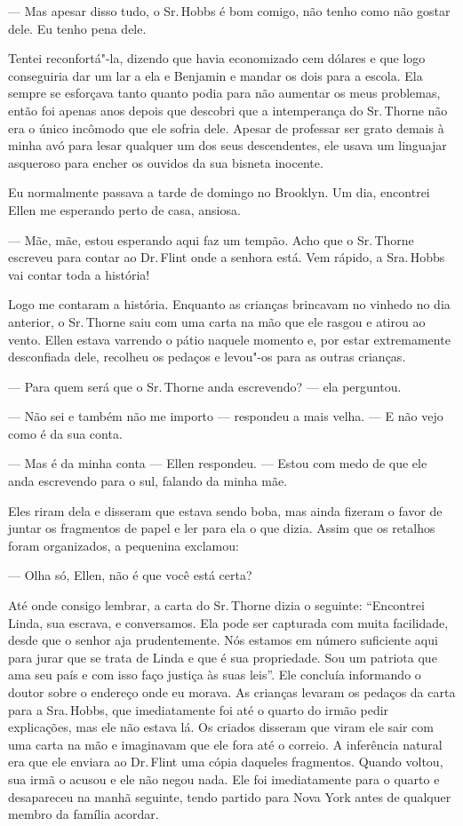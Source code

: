 --- Mas apesar disso tudo, o Sr.\,Hobbs é bom comigo, não tenho como não
gostar dele. Eu tenho pena dele.

Tentei reconfortá"-la, dizendo que havia economizado cem dólares e que
logo conseguiria dar um lar a ela e Benjamin e mandar os dois para a
escola. Ela sempre se esforçava tanto quanto podia para não aumentar os
meus problemas, então foi apenas anos depois que descobri que a
intemperança do Sr.\,Thorne não era o único incômodo que ele sofria dele.
Apesar de professar ser grato demais à minha avó para lesar qualquer um
dos seus descendentes, ele usava um linguajar asqueroso para encher os
ouvidos da sua bisneta inocente.

Eu normalmente passava a tarde de
domingo no Brooklyn. Um dia, encontrei Ellen me esperando perto de casa,
ansiosa.

--- Mãe, mãe, estou esperando aqui faz um tempão. Acho que o Sr.\,Thorne
escreveu para contar ao Dr.\,Flint onde a senhora está. Vem rápido, a
Sra.\,Hobbs vai contar toda a história!

Logo me contaram a história. Enquanto
as crianças brincavam no vinhedo no dia anterior, o Sr.\,Thorne saiu com
uma carta na mão que ele rasgou e atirou ao vento. Ellen estava varrendo
o pátio naquele momento e, por estar extremamente desconfiada dele,
recolheu os pedaços e levou"-os para as outras crianças.

--- Para quem será que o Sr.\,Thorne anda escrevendo? --- ela perguntou.

--- Não sei e também não me importo ---
respondeu a mais velha. --- E não vejo como é da sua conta.

--- Mas é da minha conta --- Ellen
respondeu. --- Estou com medo de que ele anda escrevendo para o sul,
falando da minha mãe.

Eles riram dela e disseram que estava
sendo boba, mas ainda fizeram o favor de juntar os fragmentos de papel e
ler para ela o que dizia. Assim que os retalhos foram organizados, a
pequenina exclamou:

--- Olha só, Ellen, não é que você está certa?

Até onde consigo lembrar, a carta do
Sr.\,Thorne dizia o seguinte: ``Encontrei Linda, sua escrava, e
conversamos. Ela pode ser capturada com muita facilidade, desde que o
senhor aja prudentemente. Nós estamos em número suficiente aqui para
jurar que se trata de Linda e que é sua propriedade. Sou um patriota que
ama seu país e com isso faço justiça às suas leis''. Ele concluía
informando o doutor sobre o endereço onde eu morava. As crianças levaram
os pedaços da carta para a Sra.\,Hobbs, que imediatamente foi até o
quarto do irmão pedir explicações, mas ele não estava lá. Os criados
disseram que viram ele sair com uma carta na mão e imaginavam que ele
fora até o correio. A inferência natural era que ele enviara ao Dr.\,Flint uma cópia daqueles fragmentos. Quando voltou, sua irmã o acusou e
ele não negou nada. Ele foi imediatamente para o quarto e desapareceu na
manhã seguinte, tendo partido para Nova York antes de qualquer membro da
família acordar.

